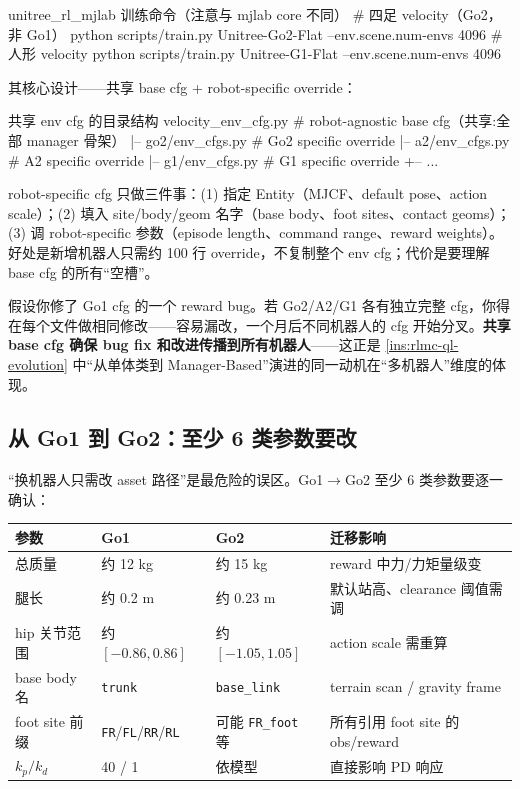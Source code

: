 \begin{codebox}[bash]{unitree\_rl\_mjlab 训练命令（注意与 mjlab core 不同）}
# 四足 velocity（Go2，非 Go1）
python scripts/train.py Unitree-Go2-Flat --env.scene.num-envs 4096
# 人形 velocity
python scripts/train.py Unitree-G1-Flat --env.scene.num-envs 4096
\end{codebox}

其核心设计——共享 base cfg + robot-specific override：

\begin{codebox}{共享 env cfg 的目录结构}
velocity_env_cfg.py        # robot-agnostic base cfg（共享:全部 manager 骨架）
|-- go2/env_cfgs.py        # Go2 specific override
|-- a2/env_cfgs.py         # A2 specific override
|-- g1/env_cfgs.py         # G1 specific override
+-- ...
\end{codebox}

robot-specific cfg 只做三件事：(1) 指定 Entity（MJCF、default pose、action scale）；(2) 填入 site/body/geom 名字（base body、foot sites、contact geoms）；(3) 调 robot-specific 参数（episode length、command range、reward weights）。好处是新增机器人只需约 100 行 override，不复制整个 env cfg；代价是要理解 base cfg 的所有“空槽”。

\begin{insight}\label{ins:rlmc-ql-sharecfg}
假设你修了 Go1 cfg 的一个 reward bug。若 Go2/A2/G1 各有独立完整 cfg，你得在每个文件做相同修改——容易漏改，一个月后不同机器人的 cfg 开始分叉。\textbf{共享 base cfg 确保 bug fix 和改进传播到所有机器人}——这正是 \cref{ins:rlmc-ql-evolution} 中“从单体类到 Manager-Based”演进的同一动机在“多机器人”维度的体现。
\end{insight}

\subsection{从 Go1 到 Go2：至少 6 类参数要改}
\label{sec:rlmc-ql-multirobot-migrate}

“换机器人只需改 asset 路径”是最危险的误区。Go1$\to$Go2 至少 6 类参数要逐一确认：

\begin{center}
\small
\begin{tabular}{@{}llll@{}}
\toprule
参数 & Go1 & Go2 & 迁移影响 \\
\midrule
总质量 & 约 12 kg & 约 15 kg & reward 中力/力矩量级变 \\
腿长 & 约 0.2 m & 约 0.23 m & 默认站高、clearance 阈值需调 \\
hip 关节范围 & 约 $[-0.86,0.86]$ & 约 $[-1.05,1.05]$ & action scale 需重算 \\
base body 名 & \verb|trunk| & \verb|base_link| & terrain scan / gravity frame \\
foot site 前缀 & \verb|FR|/\allowbreak\verb|FL|/\allowbreak\verb|RR|/\allowbreak\verb|RL| & 可能 \verb|FR_foot| 等 & 所有引用 foot site 的 obs/reward \\
$k_p/k_d$ & 40 / 1 & 依模型 & 直接影响 PD 响应 \\
\bottomrule
\end{tabular}
\end{center}

